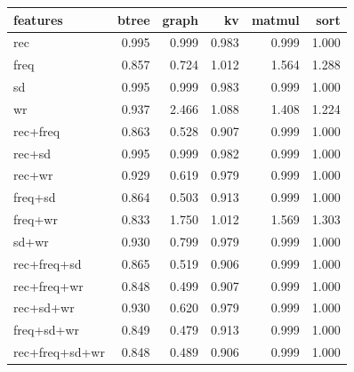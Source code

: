 \begin{tabular}{lrrrrr}
\toprule
features & btree & graph & kv & matmul & sort \\
\midrule
rec & 0.995 & 0.999 & 0.983 & 0.999 & 1.000 \\
freq & 0.857 & 0.724 & 1.012 & 1.564 & 1.288 \\
sd & 0.995 & 0.999 & 0.983 & 0.999 & 1.000 \\
wr & 0.937 & 2.466 & 1.088 & 1.408 & 1.224 \\
rec{+}freq & 0.863 & 0.528 & 0.907 & 0.999 & 1.000 \\
rec{+}sd & 0.995 & 0.999 & 0.982 & 0.999 & 1.000 \\
rec{+}wr & 0.929 & 0.619 & 0.979 & 0.999 & 1.000 \\
freq{+}sd & 0.864 & 0.503 & 0.913 & 0.999 & 1.000 \\
freq{+}wr & 0.833 & 1.750 & 1.012 & 1.569 & 1.303 \\
sd{+}wr & 0.930 & 0.799 & 0.979 & 0.999 & 1.000 \\
rec{+}freq{+}sd & 0.865 & 0.519 & 0.906 & 0.999 & 1.000 \\
rec{+}freq{+}wr & 0.848 & 0.499 & 0.907 & 0.999 & 1.000 \\
rec{+}sd{+}wr & 0.930 & 0.620 & 0.979 & 0.999 & 1.000 \\
freq{+}sd{+}wr & 0.849 & 0.479 & 0.913 & 0.999 & 1.000 \\
rec{+}freq{+}sd{+}wr & 0.848 & 0.489 & 0.906 & 0.999 & 1.000 \\
\bottomrule
\end{tabular}
